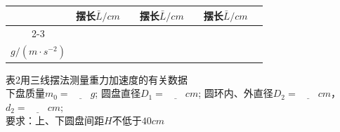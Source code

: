 \documentclass{ctexart}
\begin{document}
\begin{table}[]
\begin{tabular}{|c|ccc|ccc|ccc|}
                                        & \multicolumn{2}{c|}{摆长$\bar{L}/cm$}                                                                         &                                                  & \multicolumn{2}{c|}{摆长$\bar{L}/cm$}                                                                                                                                          &                                                                        & \multicolumn{2}{c|}{摆长$\bar{L}/cm$}                                                                                                                                          &                   \\ \cline{2-3} \cline{5-6} \cline{8-9}
                                        & \multicolumn{2}{c|}{}                                                                                              & \multicolumn{1}{c|}{}                                                                        & \multicolumn{2}{c|}{}                                                              &                                                                        & \multicolumn{2}{c|}{}                                                                                         &             \\ \hline
$g/(m\cdot s^{-2})$                 & \multicolumn{3}{c|}{}                                                     & \multicolumn{3}{c|}{}                                                     & \multicolumn{3}{c|}{}                                                     \\ \hline
\end{tabular}
\end{table}
表2\hspace{3em}用三线摆法测量重力加速度的有关数据\\
下盘质量$m_0 = \underline{\hspace{2em}} g $; 圆盘直径$D_1 = \underline{\hspace{2em}} cm $; 圆环内、外直径$D_2 = \underline{\hspace{2em}} cm $，$d_2 = \underline{\hspace{2em}} cm ;$\\
要求：上、下圆盘间距$H$不低于$40cm$\\
\end{document}
